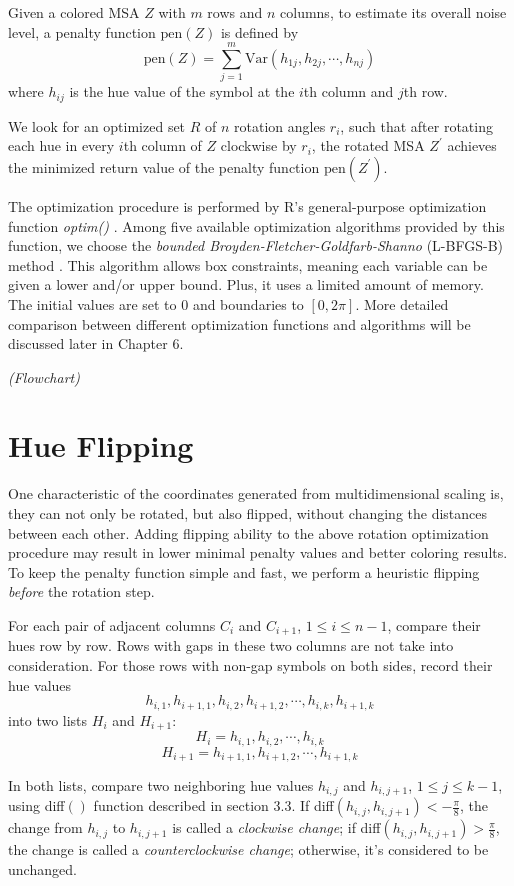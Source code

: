 Given a colored MSA $Z$ with $m$ rows and $n$ columns, to estimate its overall noise level, a penalty function $\mathrm{pen}(Z)$ is defined by $$\mathrm{pen}(Z)=\displaystyle\sum_{j=1}^m \mathrm{Var}(h_{1j},h_{2j},\cdots,h_{nj})$$ where $h_{ij}$ is the hue value of the symbol at the $i$th column and $j$th row.

We look for an optimized set $R$ of $n$ rotation angles $r_i$, such that after rotating each hue in every $i$th column of $Z$ clockwise by $r_i$, the rotated MSA $Z^\prime$ achieves the minimized return value of the penalty function $\mathrm{pen}(Z^\prime)$.

The optimization procedure is performed by R's general-purpose optimization function \emph{optim()} \cite{R2009aa}. Among five available optimization algorithms provided by this function, we choose the \emph{bounded Broyden-Fletcher-Goldfarb-Shanno} (L-BFGS-B) method \cite{Byrd:1995aa}. This algorithm allows box constraints, meaning each variable can be given a lower and/or upper bound. Plus, it uses a limited amount of memory. The initial values are set to 0 and boundaries to $[0, 2\pi]$. More detailed comparison between different optimization functions and algorithms will be discussed later in Chapter 6.

\emph{(Flowchart)}

\section{Hue Flipping}

One characteristic of the coordinates generated from multidimensional scaling is, they can not only be rotated, but also flipped, without changing the distances between each other. Adding flipping ability to the above rotation optimization procedure may result in lower minimal penalty values and better coloring results. To keep the penalty function simple and fast, we perform a heuristic flipping \emph{before} the rotation step.

For each pair of adjacent columns $C_i$ and $C_{i+1}$, $1 \le i \le n-1$, compare their hues row by row. Rows with gaps in these two columns are not take into consideration. For those rows with non-gap symbols on both sides, record their hue values $$h_{i,1},h_{i+1,1},h_{i,2},h_{i+1,2},\cdots,h_{i,k},h_{i+1,k}$$ into two lists $H_i$ and $H_{i+1}$: $$H_i=h_{i,1},h_{i,2},\cdots,h_{i,k}$$ $$H_{i+1}=h_{i+1,1},h_{i+1,2},\cdots,h_{i+1,k}$$

In both lists, compare two neighboring hue values $h_{i,j}$ and $h_{i,j+1}$, $1\le j\le k-1$, using diff$()$ function described in section 3.3. If diff$(h_{i,j},h_{i,j+1})<-\frac{\pi}{8}$, the change from $h_{i,j}$ to $h_{i,j+1}$ is called a \emph{clockwise change}; if diff$(h_{i,j},h_{i,j+1})>\frac{\pi}{8}$, the change is called a \emph{counterclockwise change}; otherwise, it's considered to be unchanged.

